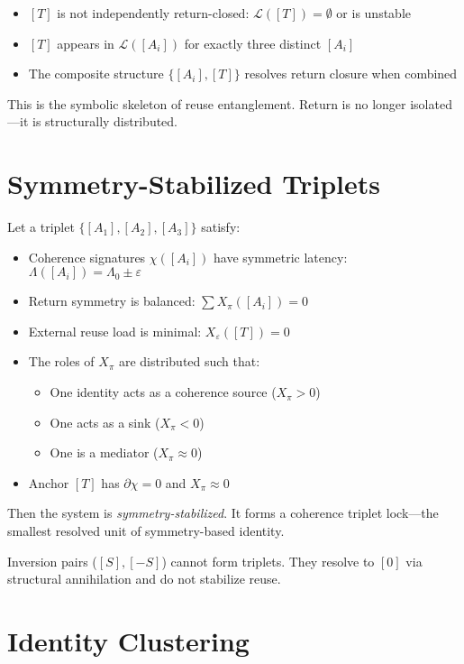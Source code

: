 \begin{itemize}
  \item $[T]$ is not independently return-closed: $\mathcal{L}([T]) = \emptyset$ or is unstable
  \item $[T]$ appears in $\mathcal{L}([A_i])$ for exactly three distinct $[A_i]$
  \item The composite structure $\{ [A_i], [T] \}$ resolves return closure when combined
\end{itemize}

This is the symbolic skeleton of reuse entanglement.  
Return is no longer isolated—it is structurally distributed.

\section{Symmetry-Stabilized Triplets} \label{symmetry-stabilized-triplets}

Let a triplet $\{ [A_1], [A_2], [A_3] \}$ satisfy:

\begin{itemize}
  \item Coherence signatures $\chi([A_i])$ have symmetric latency: $\Lambda([A_i]) = \Lambda_0 \pm \varepsilon$
  \item Return symmetry is balanced: $\sum X_\pi([A_i]) = 0$
  \item External reuse load is minimal: $X_\varepsilon([T]) = 0$
  \item The roles of $X_\pi$ are distributed such that:
    \begin{itemize}
      \item One identity acts as a coherence source ($X_\pi > 0$)
      \item One acts as a sink ($X_\pi < 0$)
      \item One is a mediator ($X_\pi \approx 0$)
    \end{itemize}
  \item Anchor $[T]$ has $\partial \chi = 0$ and $X_\pi \approx 0$
\end{itemize}

Then the system is \textit{symmetry-stabilized}.  
It forms a coherence triplet lock—the smallest resolved unit of symmetry-based identity.

\medskip

Inversion pairs ($[S], [-S]$) cannot form triplets.  
They resolve to $[0]$ via structural annihilation and do not stabilize reuse.

\section{Identity Clustering} \label{identity-clustering}

